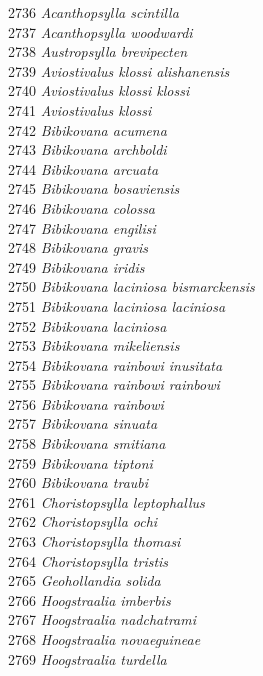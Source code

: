 \documentclass[
]{article}
\begin{document}
2736 \emph{Acanthopsylla scintilla}\\
2737 \emph{Acanthopsylla woodwardi}\\
2738 \emph{Austropsylla brevipecten}\\
2739 \emph{Aviostivalus klossi alishanensis}\\
2740 \emph{Aviostivalus klossi klossi}\\
2741 \emph{Aviostivalus klossi}\\
2742 \emph{Bibikovana acumena}\\
2743 \emph{Bibikovana archboldi}\\
2744 \emph{Bibikovana arcuata}\\
2745 \emph{Bibikovana bosaviensis}\\
2746 \emph{Bibikovana colossa}\\
2747 \emph{Bibikovana engilisi}\\
2748 \emph{Bibikovana gravis}\\
2749 \emph{Bibikovana iridis}\\
2750 \emph{Bibikovana laciniosa bismarckensis}\\
2751 \emph{Bibikovana laciniosa laciniosa}\\
2752 \emph{Bibikovana laciniosa}\\
2753 \emph{Bibikovana mikeliensis}\\
2754 \emph{Bibikovana rainbowi inusitata}\\
2755 \emph{Bibikovana rainbowi rainbowi}\\
2756 \emph{Bibikovana rainbowi}\\
2757 \emph{Bibikovana sinuata}\\
2758 \emph{Bibikovana smitiana}\\
2759 \emph{Bibikovana tiptoni}\\
2760 \emph{Bibikovana traubi}\\
2761 \emph{Choristopsylla leptophallus}\\
2762 \emph{Choristopsylla ochi}\\
2763 \emph{Choristopsylla thomasi}\\
2764 \emph{Choristopsylla tristis}\\
2765 \emph{Geohollandia solida}\\
2766 \emph{Hoogstraalia imberbis}\\
2767 \emph{Hoogstraalia nadchatrami}\\
2768 \emph{Hoogstraalia novaeguineae}\\
2769 \emph{Hoogstraalia turdella}\\
\end{document}
